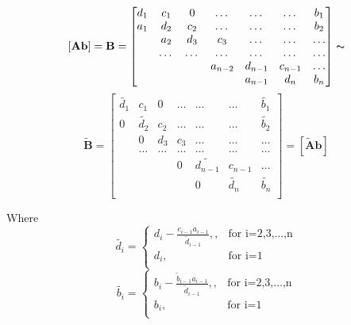 \documentclass[%
oneside,                 %
final,                   %
10pt]{article}
\begin{document}
\[
   [\mathbf{A} \mathbf{b} ]= \mathbf{B} = \begin{bmatrix}
                           d_1& c_1 & 0 &\dots   & \dots &\dots  &b_1\\
                           a_1 & d_2 & c_2 &\dots &\dots &\dots  &b_2\\
                           & a_2 & d_3 & c_3 & \dots   &\dots &\dots  \\
                           & \dots   & \dots &\dots   &\dots &\dots & \dots\\
                           &   &  &a_{n-2}  &d_{n-1}& c_{n-1}  & \dots\\
                           &    &  &   &a_{n-1} & d_n  &b_n\\
                      \end{bmatrix}
                      \thicksim \]
\break
\[
    \mathbf{\tilde{B}} = \begin{bmatrix}
                           \tilde{d_1}& c_1 & 0 &\dots   & \dots &\dots  &\tilde{b_1}\\
                           0 & \tilde{d_2} & c_2 &\dots &\dots &\dots  &\tilde{b_2}\\
                           & 0 & d_3 & c_3 & \dots & \dots &\dots    \\
                           & \dots   & \dots &\dots   &\dots  &\dots & \dots\\
                           &   &  &0  &\tilde{d_{n-1}}& c_{n-1}  & \dots\\
                           &    &  &   &0 & \tilde{d_n}  &\tilde{b_n}\\
                      \end{bmatrix}=[\mathbf{\tilde{A}} \mathbf{b}]
\]
                      
Where \begin{equation}
\tilde{d_i} =
  \begin{cases}
                                  d_i-\frac{c_{i-1} a_{i-1}}{\tilde{d}_{i-1}}, , & \text{for i=2,3,...,n}\\
                                   d_i ,  & \text{for i=1} \\

  \end{cases}
\label{eq:tilded_i}
\end{equation}
\begin{equation}
\tilde{b_i}=
  \begin{cases}
                                  b_i-\frac{\tilde{b}_{i-1} a_{i-1}}{\tilde{d}_{i-1}}, , & \text{for i=2,3,...,n}\\
                                   b_i ,  & \text{for i=1} \\

  \end{cases}
\label{eq:b_i}
\end{equation}
              
\end{document}
